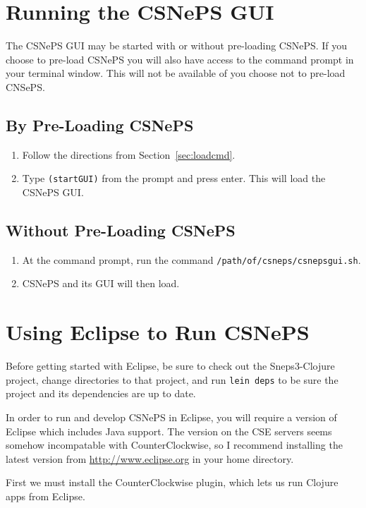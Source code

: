 \documentclass[letterpaper,colorlinks=true,linkcolor=blue]{book}
\begin{document}
\section{Running the CSNePS GUI}

The CSNePS GUI may be started with or without pre-loading CSNePS. If you choose to pre-load CSNePS you will also have access to the command prompt in your terminal window. This will not be available of you choose not to pre-load CNSePS. 

\subsection{By Pre-Loading CSNePS}

\begin{enumerate}
  \item Follow the directions from Section~\ref{sec:loadcmd}.
  \item Type \texttt{(startGUI)} from the prompt and press enter. This will load the CSNePS GUI.
\end{enumerate}

\subsection{Without Pre-Loading CSNePS}

\begin{enumerate}
  \item At the command prompt, run the command \texttt{/path/of/csneps/csnepsgui.sh}.
  \item CSNePS and its GUI will then load.
\end{enumerate}

\section{Using Eclipse to Run CSNePS}

Before getting started with Eclipse, be sure to check out the Sneps3-Clojure project, change directories to that project, and run \texttt{lein deps} to be sure the project and its dependencies are up to date.

In order to run and develop CSNePS in Eclipse, you will require a version of Eclipse which includes Java support. The version on the CSE servers seems somehow incompatable with CounterClockwise, so I recommend installing the latest version from \url{http://www.eclipse.org} in your home directory.

First we must install the CounterClockwise plugin, which lets us run Clojure apps from Eclipse.
\end{document}
